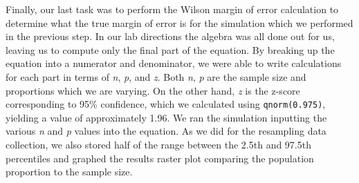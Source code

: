 \documentclass{article}\usepackage[]{graphicx}\usepackage[]{xcolor}
\begin{document}
\begin{multicols}{2}
Finally, our last task was to perform the Wilson margin of error calculation to determine what the true margin of error is for the simulation which we performed in the previous step. In our lab directions the algebra was all done out for us, leaving us to compute only the final part of the equation. By breaking up the equation into a numerator and denominator, we were able to write calculations for each part in terms of \textit{n}, \textit{p}, and \textit{z}. Both \textit{n}, \textit{p} are the sample size and proportions which we are varying. On the other hand, \textit{z} is the z-score corresponding to 95\% confidence, which we calculated using \texttt{qnorm(0.975)}, yielding a value of approximately 1.96.  We ran the simulation inputting the various \textit{n} and \textit{p} values into the equation. As we did for the resampling data collection, we also stored half of the range between the 2.5th and 97.5th percentiles and graphed the results raster plot comparing the population proportion to the sample size.






\end{multicols}
\end{document}
